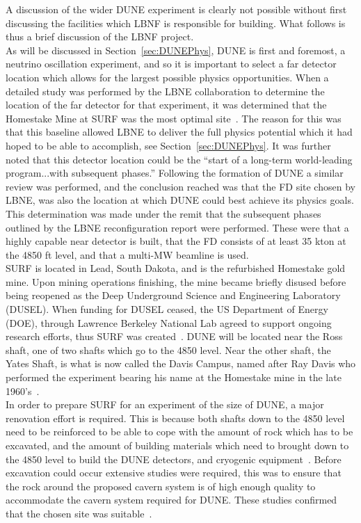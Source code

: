 A discussion of the wider DUNE experiment is clearly not possible without first discussing the facilities which LBNF is responsible for building. What follows is thus a brief discussion of the LBNF project. \\

As will be discussed in Section~\ref{sec:DUNEPhys}, DUNE is first and foremost, a neutrino oscillation experiment, and so it is important to select a far detector location which allows for the largest possible physics opportunities. When a detailed study was performed by the LBNE collaboration to determine the location of the far detector for that experiment, it was determined that the Homestake Mine at SURF was the most optimal site~\citep{LBNEReconfig}. The reason for this was that this baseline allowed LBNE to deliver the full physics potential which it had hoped to be able to accomplish, see Section~\ref{sec:DUNEPhys}. It was further noted that this detector location could be the ``start of a long-term world-leading program...with subsequent phases.'' Following the formation of DUNE a similar review was performed, and the conclusion reached was that the FD site chosen by LBNE, was also the location at which DUNE could best achieve its physics goals. This determination was made under the remit that the subsequent phases outlined by the LBNE reconfiguration report were performed. These were that a highly capable near detector is built, that the FD consists of at least 35 kton at the 4850 ft level, and that a multi-MW beamline is used. \\

SURF is located in Lead, South Dakota, and is the refurbished Homestake gold mine. Upon mining operations finishing, the mine became briefly disused before being reopened as the Deep Underground Science and Engineering Laboratory (DUSEL). When funding for DUSEL ceased, the US Department of Energy (DOE), through Lawrence Berkeley National Lab agreed to support ongoing research efforts, thus SURF was created~\citep{SURFWebsite}. DUNE will be located near the Ross shaft, one of two shafts which go to the 4850 level. Near the other shaft, the Yates Shaft, is what is now called the Davis Campus, named after Ray Davis who performed the experiment bearing his name at the Homestake mine in the late 1960's~\citep{RayDavis1968, RayDavis1988}. \\

In order to prepare SURF for an experiment of the size of DUNE, a major renovation effort is required. This is because both shafts down to the 4850 level need to be reinforced to be able to cope with the amount of rock which has to be excavated, and the amount of building materials which need to brought down to the 4850 level to build the DUNE detectors, and cryogenic equipment~\citep{DUNECDR_V3}. Before excavation could occur extensive studies were required, this was to ensure that the rock around the proposed cavern system is of high enough quality to accommodate the cavern system required for DUNE. These studies confirmed that the chosen site was suitable~\citep{DUNECDR_V3}. \\

